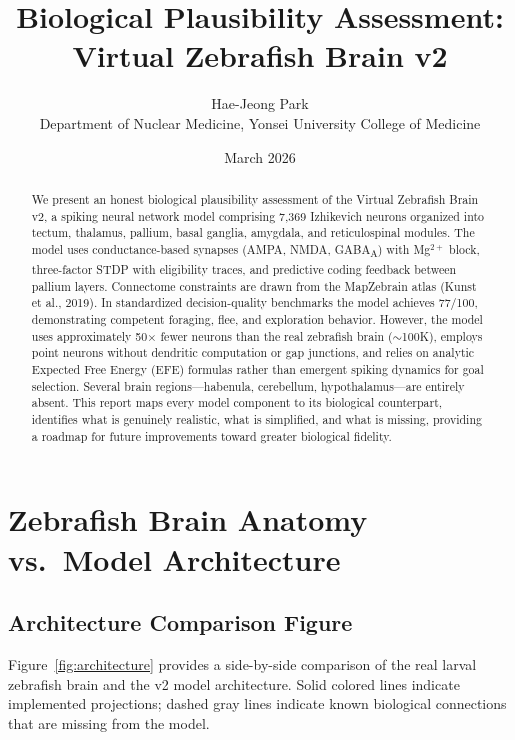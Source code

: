 \documentclass[11pt,a4paper]{article}
\title{\textbf{Biological Plausibility Assessment:\\Virtual Zebrafish Brain v2}}
\author{Hae-Jeong Park\\Department of Nuclear Medicine, Yonsei University College of Medicine}
\date{March 2026}
\begin{document}
\maketitle

\begin{abstract}
We present an honest biological plausibility assessment of the Virtual Zebrafish Brain v2,
a spiking neural network model comprising 7,369 Izhikevich neurons organized into
tectum, thalamus, pallium, basal ganglia, amygdala, and reticulospinal modules.
The model uses conductance-based synapses (AMPA, NMDA, GABA\textsubscript{A}) with
Mg$^{2+}$ block, three-factor STDP with eligibility traces, and predictive coding
feedback between pallium layers.  Connectome constraints are drawn from the MapZebrain
atlas (Kunst et al., 2019).
In standardized decision-quality benchmarks the model achieves 77/100,
demonstrating competent foraging, flee, and exploration behavior.
However, the model uses approximately 50$\times$ fewer neurons than the real
zebrafish brain ($\sim$100K), employs point neurons without dendritic computation or
gap junctions, and relies on analytic Expected Free Energy (EFE) formulas rather than
emergent spiking dynamics for goal selection.
Several brain regions---habenula, cerebellum, hypothalamus---are entirely absent.
This report maps every model component to its biological counterpart, identifies what
is genuinely realistic, what is simplified, and what is missing, providing a roadmap
for future improvements toward greater biological fidelity.
\end{abstract}

\tableofcontents
\newpage

\section{Zebrafish Brain Anatomy vs.\ Model Architecture}
\label{sec:anatomy}

\subsection{Architecture Comparison Figure}

Figure~\ref{fig:architecture} provides a side-by-side comparison of the real larval
zebrafish brain and the v2 model architecture.  Solid colored lines indicate
implemented projections; dashed gray lines indicate known biological connections
that are missing from the model.
\end{document}
